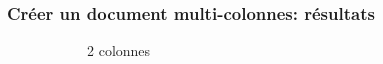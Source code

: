 \documentclass{clic_latex_beamer}
\begin{document}
\begin{frame}
\frametitle{Créer un document multi-colonnes: résultats}
\begin{figure}
        \centering
        \begin{subfigure}[b]{0.3\textwidth}
                \caption*{2 colonnes}
        \end{subfigure}
        ~ 
        \begin{subfigure}[b]{0.3\textwidth}

\end{subfigure}
\end{figure}
\end{frame}
\end{document}
